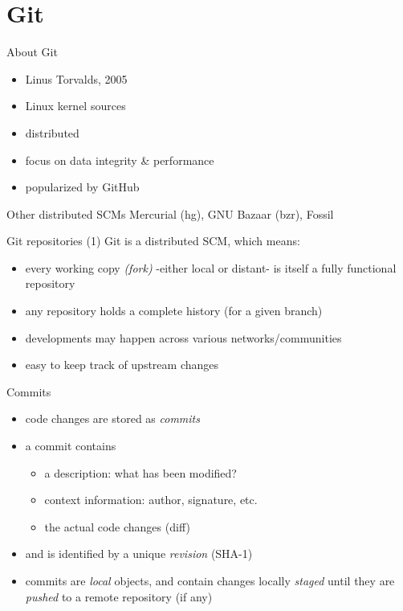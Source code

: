 \section{Git}
\begin{frame}{About Git}
  \begin{itemize}
    \item Linus Torvalds, 2005
    \item Linux kernel sources
    \item distributed
    \item focus on data integrity \& performance
    \item popularized by GitHub
  \end{itemize}
  \begin{block}{Other distributed SCMs}
    Mercurial (hg), GNU Bazaar (bzr), Fossil
  \end{block}
\end{frame}

\begin{frame}{Git repositories (1)}
  Git is a distributed SCM, which means:
  \begin{itemize}
    \item every working copy \textit{(fork)} -either local or distant-
      is itself a fully functional repository
    \item any repository holds a complete history (for a given branch)
    \item developments may happen across various networks/communities
    \item easy to keep track of upstream changes
  \end{itemize}
\end{frame}

\begin{frame}{Commits}
  \begin{itemize}
    \item code changes are stored as \textit{commits}
    \item a commit contains
      \begin{itemize}
        \item a description: what has been modified?
        \item context information: author, signature, etc.
        \item the actual code changes (diff)
      \end{itemize}
    \item and is identified by a unique \textit{revision} (SHA-1)
    \item commits are \textit{local} objects, and contain changes locally
      \textit{staged} until they are \textit{pushed} to a remote repository
      (if any)
  \end{itemize}
\end{frame}

